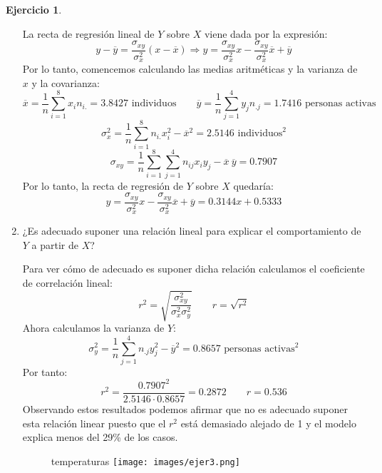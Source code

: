 \documentclass[a4paper, 12pt]{article}
\theoremstyle{definition}
\newtheorem{ej}{Ejercicio}
\begin{document}
\begin{ej}
\begin{enumerate}[label=\alph*)]
La recta de regresión lineal de \(Y\) sobre \(X\) viene dada por la expresión:
\[
	y - \overline{y}  =\frac{\sigma_{xy}}{\sigma_x^2} (x - \overline{x}) \Rightarrow y = \frac{\sigma_{xy}}{\sigma_x^2}x - \frac{\sigma_{xy}}{\sigma_x^2} \overline{x} + \overline{y}
\]
Por lo tanto, comencemos calculando las medias aritméticas y la varianza de \(x\) y la covarianza:
\[
	\overline{x} = \frac{1}{n} \sum_{i=1}^{8} x_i n_{i.} = 3.8427 \text{ individuos} \qquad \overline{y} = \frac{1}{n} \sum_{j=1}^{4} y_j n_{.j} = 1.7416 \text{ personas activas}
\]
\[
	\sigma_x^2 = \frac{1}{n} \sum_{i=1}^{8} n_{i.} x_i^2 - \overline{x}^2 = 2.5146 \text{ individuos}^2
\]
\[
	\sigma_{xy} = \frac{1}{n} \sum_{i=1}^{8} \sum_{j=1}^{4} n_{ij} x_i y_j - \overline{x}\ \overline{y} = 0.7907
\]
Por lo tanto, la recta de regresión de \(Y\) sobre \(X\) quedaría:
\[
	y = \frac{\sigma_{xy}}{\sigma_x^2}x - \frac{\sigma_{xy}}{\sigma_x^2} \overline{x} + \overline{y} = 0.3144x + 0.5333
\]

	\item ¿Es adecuado suponer una relación lineal para explicar el comportamiento de \(Y\) a partir de \(X\)?
	
Para ver cómo de adecuado es suponer dicha relación calculamos el coeficiente de correlación lineal:
\[
	r^2 = \sqrt{\frac{\sigma_{xy}^2}{\sigma_x^2 \sigma_y^2}} \qquad r = \sqrt{r^2}
\]
Ahora calculamos la varianza de \(Y\):
\[
	\sigma_y^2 = \frac{1}{n} \sum_{j=1}^{4} n_{.j} y_j^2 - \overline{y}^2 = 0.8657 \text{ personas activas}^2
\]
Por tanto:
\[
	r^2 = \frac{0.7907^2}{2.5146 \cdot 0.8657} = 0.2872 \qquad r = 0.536
\]
Observando estos resultados podemos afirmar que no es adecuado suponer esta relación linear puesto que el $r^2$ está demasiado alejado de 1 y el modelo explica menos del 29\% de los casos.

\begin{figure}[h!]
	\centering
temperaturas	\texttt{[image: images/ejer3.png]}
\end{figure}

\end{enumerate}

\end{ej}
\end{document}
